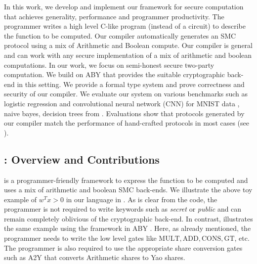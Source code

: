 In this work, we develop and implement our framework \tool {} for secure computation that achieves generality, performance and programmer productivity. The programmer writes a high level C-like program (instead of a circuit) to describe the function to be computed. Our compiler automatically generates an SMC protocol using a mix of Arithmetic and Boolean compute. Our compiler is general and can work with any secure implementation of a mix of arithmetic and boolean computations. In our work, we focus on semi-honest secure two-party computation. We build on ABY \cite{aby} that provides the suitable cryptographic back-end in this setting. We provide a formal type system and prove correctness and security of our compiler. We evaluate our system on various benchmarks such as logistic regression and convolutional neural network (CNN) for MNIST data \cite{minionn}, naive bayes, decision trees from \cite{shafindss}. Evaluations show that protocols generated by our compiler match the performance of hand-crafted protocols in most cases (see ). 


\subsection{\tool: Overview and Contributions} 
\label{sec:contrib}

\tool is a programmer-friendly framework to express the function to be computed and uses a mix of arithmetic and boolean SMC back-ends. We illustrate the above toy example of $w^Tx >0$ in our language in . As is clear from the code, the programmer is not required to write keywords such as {\em secret} or {\em public} and can remain completely oblivious of the cryptographic back-end. In contrast,  illustrates the same example using the framework in ABY \cite{aby}. Here, as already mentioned, the programmer needs to write the low level gates like $\mathrm{MULT, ADD, CONS, GT}$, etc. The programmer is also required to use the appropriate share conversion gates such as A2Y that converts Arithmetic shares to Yao shares. 


